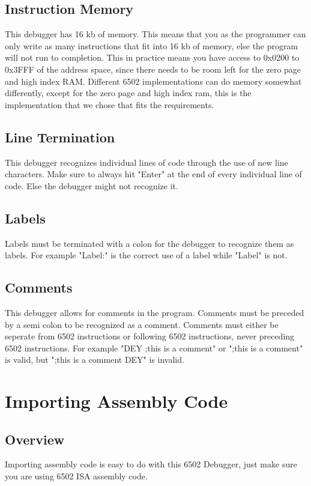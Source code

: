 \documentclass[a3paper, 11pt]{article}
\begin{document}
\subsection{Instruction Memory}
This debugger has 16 kb of memory. This means that you as the programmer can only write as many instructions that fit into 16 kb of memory, else the program will not run to completion. This in practice means you have access to 0x0200 to 0x3FFF of the address space, since there needs to be room left for the zero page and high index RAM. Different 6502 implementations can do memory somewhat differently, except for the zero page and high index ram, this is the implementation that we chose that fits the requirements.
\subsection{Line Termination}
This debugger recognizes individual lines of code through the use of new line characters. Make sure to always hit "Enter" at the end of every individual line of code. Else the debugger might not recognize it.
\subsection{Labels}
Labels must be terminated with a colon for the debugger to recognize them as labels. For example "Label:" is the correct use of a label while "Label" is not. 
\subsection{Comments}
This debugger allows for comments in the program. Comments must be preceded by a semi colon to be recognized as a comment. Comments must either be seperate from 6502 instructions or following 6502 instructions, never preceding 6502 instructions. For example "DEY ;this is a comment" or ";this is a comment" is valid, but ";this is a comment DEY" is invalid.
\pagebreak

\section{Importing Assembly Code}
\subsection{Overview}
Importing assembly code is easy to do with this 6502 Debugger, just make sure you are using 6502 ISA assembly code.
\end{document}
